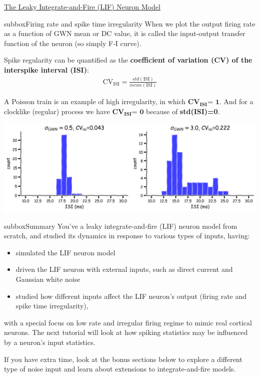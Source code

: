 \begin{textbox}{\href{https://compneuro.neuromatch.io/tutorials/W1D4_GeneralizedLinearModels/student/W1D4_Tutorial1.html}{The Leaky Integrate-and-Fire (LIF) Neuron Model } }
\begin{subbox}{subbox}{Firing rate and spike time irregularity}
\scriptsize
When we plot the output firing rate as a function of GWN mean or DC value, it is called the input-output transfer function of the neuron (so simply F-I curve).

Spike regularity can be quantified as the \textbf{coefficient of variation (CV) of the interspike interval (ISI)}:
\begin{align}
\text{CV}_{\text{ISI}} = \frac{std(\text{ISI})}{mean(\text{ISI})}
\end{align}

A Poisson train is an example of high irregularity, in which $\textbf{CV}_{\textbf{ISI}} \textbf{= 1}$. And for a clocklike (regular) process we have $\textbf{CV}_{\textbf{ISI}} \textbf{= 0}$ because of \textbf{std(ISI)=0}.

\centering
\includegraphics[scale=0.09]{Figures/BNM/LIF_Figure4.png}
\end{subbox}

\begin{subbox}{subbox}{Summary 
}
\scriptsize
You've a leaky integrate-and-fire (LIF) neuron model from scratch, and studied its dynamics in response to various types of inputs, having:
\begin{itemize}
    \item 
 simulated the LIF neuron model
\item 
 driven the LIF neuron with external inputs, such as direct current and Gaussian white noise

\item 
studied how different inputs affect the  LIF neuron's output (firing rate and spike time irregularity),
\end{itemize}

with a special focus on low rate and irregular firing regime to mimic real cortical neurons. The next tutorial will look at how spiking statistics may be influenced by a neuron's input statistics.

If you have extra time, look at the bonus sections below to explore a different type of noise input and learn about extensions to integrate-and-fire models.

\end{subbox}
\end{textbox}
